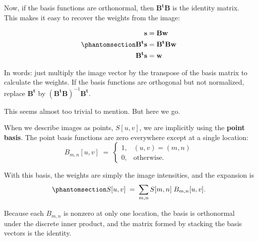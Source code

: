 \documentclass[
  letterpaper,
]{book}
\begin{document}
Now, if the basis functions are orthonormal, then \(\mathbf{B^t B}\) is
the identity matrix. This makes it easy to recover the weights from the
image:

\begin{equation}\phantomsection\label{eq-linear-model-inverse}{
\begin{aligned}
\mathbf{s} &= \mathbf{B w} \\
\mathbf{B^t s} &= \mathbf{B^t B w} \\
\mathbf{B^t s} &= \mathbf{w}
\end{aligned}
}\end{equation}

In words: just multiply the image vector by the transpose of the basis
matrix to calculate the weights. If the basis functions are orthogonal
but not normalized, replace \(\mathbf{B^t}\) by
\((\mathbf{B^t B})^{-1}\mathbf{B^t}\).

\begin{tcolorbox}[enhanced jigsaw, titlerule=0mm, colback=white, left=2mm, colframe=quarto-callout-note-color-frame, breakable, rightrule=.15mm, bottomtitle=1mm, title=\textcolor{quarto-callout-note-color}{\faInfo}\hspace{0.5em}{Point basis}, opacitybacktitle=0.6, toprule=.15mm, colbacktitle=quarto-callout-note-color!10!white, toptitle=1mm, coltitle=black, arc=.35mm, leftrule=.75mm, opacityback=0, bottomrule=.15mm]

This seems almost too trivial to mention. But here we go.

When we describe images as points, \(S[u,v]\), we are implicitly using
the \textbf{point basis}. The point basis functions are zero everywhere
except at a single location: \[
B_{m,n}[u,v] \;=\; \begin{cases}
1, & (u,v)=(m,n) \\
0, & \text{otherwise.}
\end{cases}
\]

With this basis, the weights are simply the image intensities, and the
expansion is
\begin{equation}\phantomsection\label{eq-point-basis-expansion}{
S[u,v] \;=\; \sum_{m,n} S[m,n]\; B_{m,n}[u,v].
}\end{equation}

Because each \(B_{m,n}\) is nonzero at only one location, the basis is
orthonormal under the discrete inner product, and the matrix formed by
stacking the basis vectors is the identity.

\end{tcolorbox}
\end{document}
